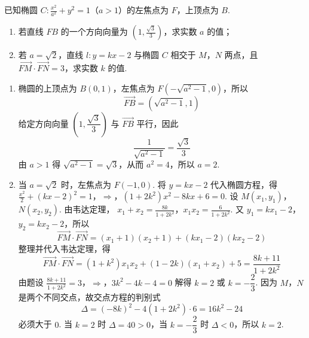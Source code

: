 \begin{problem}
已知椭圆 \(C:\frac{x^{2}}{a^{2}}+y^{2}=1\)（\(a>1\)）的左焦点为 \(F\)，上顶点为 \(B\).

\begin{enumerate}
\item 若直线 \(FB\) 的一个方向向量为 \(\left(1,\frac{\sqrt{3}}{3}\right)\)，求实数 \(a\) 的值；
\item 若 \(a=\sqrt{2}\)，直线 \(l:y=kx-2\) 与椭圆 \(C\) 相交于 \(M\)，\(N\) 两点，且 \(\overrightarrow{FM}\cdot\overrightarrow{FN}=3\)，求实数 \(k\) 的值.
\end{enumerate}
\end{problem}

\begin{solution}
\begin{enumerate}
\item 椭圆的上顶点为 \(B(0,1)\)，左焦点为 \(F(-\sqrt{a^2-1},0)\)，所以
\[
\overrightarrow{FB}=(\sqrt{a^2-1},1)
\]
给定方向向量 \(\left(1,\dfrac{\sqrt3}{3}\right)\) 与 \(\overrightarrow{FB}\) 平行，因此
\[
\frac{1}{\sqrt{a^2-1}}=\frac{\sqrt3}{3}
\]
由 \(a>1\) 得 \(\sqrt{a^2-1}=\sqrt3\)，从而 \(a^2=4\)，所以 \(a=2\).

\item 当 \(a=\sqrt2\) 时，左焦点为 \(F(-1,0)\). 将 \(y=kx-2\) 代入椭圆方程，得
\(\frac{x^2}{2}+(kx-2)^2=1\)，\(\Longrightarrow\)，\((1+2k^2)x^2-8kx+6=0\).
设 \(M(x_1,y_1)\)，\(N(x_2,y_2)\). 由韦达定理，
\(x_1+x_2=\frac{8k}{1+2k^2}\)，\(x_1x_2=\frac{6}{1+2k^2}\).
又 \(y_1=kx_1-2\)，\(y_2=kx_2-2\)，所以
\[
\overrightarrow{FM}\cdot\overrightarrow{FN}
=(x_1+1)(x_2+1)+(kx_1-2)(kx_2-2)
\]
整理并代入韦达定理，得
\[
\overrightarrow{FM}\cdot\overrightarrow{FN}
=(1+k^2)x_1x_2+(1-2k)(x_1+x_2)+5
=\frac{8k+11}{1+2k^2}
\]
由题设
\(\frac{8k+11}{1+2k^2}=3\)，\(\Longrightarrow\)，\(3k^2-4k-4=0\)
解得 \(k=2\) 或 \(k=-\dfrac23\). 因为 \(M\)，\(N\) 是两个不同交点，故交点方程的判别式
\[
\Delta=(-8k)^2-4(1+2k^2)\cdot6=16k^2-24
\]
必须大于 \(0\). 当 \(k=2\) 时 \(\Delta=40>0\)，当 \(k=-\dfrac23\) 时 \(\Delta<0\)，所以 \(k=2\).
\end{enumerate}
\end{solution}

